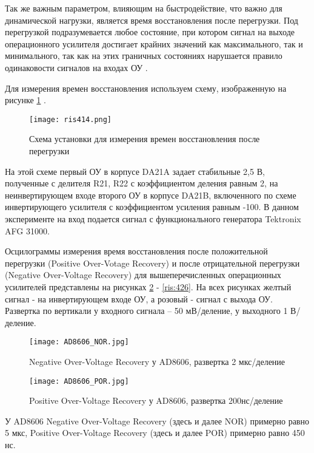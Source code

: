 Так же важным параметром, влияющим на быстродействие, что важно для динамической нагрузки, является 
время восстановления после перегрузки. Под перегрузкой подразумевается  любое состояние, при котором 
сигнал на выходе операционного усилителя достигает крайних значений как максимального, так и минимального,
так как на этих граничных состояниях нарушается правило одинаковости сигналов на входах ОУ \cite{Chopper:OU}.

Для измерения времен восстановления используем схему, изображенную на рисунке \ref{ris:414} \cite{GOST 23089.6-83}.

\begin{figure}[H]
\centering
\texttt{[image: ris414.png]}
\caption{Схема установки для измерения времен восстановления после перегрузки}
\label{ris:414}
\end{figure}

На этой схеме первый ОУ в корпусе DA21A задает стабильные 2,5 В, полученные с делителя R21, R22 с 
коэффициентом деления равным 2, на неинвертирующем входе второго ОУ в корпусе DA21B, включенного по схеме
инвертирующего усилителя с коэффициентом усиления равным -100. В данном эксперименте на вход подается 
сигнал с функционального генератора Tektronix AFG 31000.


Осцилограммы измерения время восстановления после положительной перегрузки (Positive Over-Votage Recovery) 
и после отрицательной перегрузки (Negative Over-Voltage Recovery) для вышеперечисленных операционных усилителей
представлены на рисунках \ref{ris:415} - \ref{ris:426}. На всех рисунках желтый сигнал - на инвертирующем 
входе ОУ, а розовый - сигнал с выхода ОУ. Развертка по вертикали у входного сигнала -- 50 мВ/деление, 
у выходного 1 В/деление. 

\begin{figure}[H]
\centering
\texttt{[image: AD8606\_NOR.jpg]}
\caption{Negative Over-Voltage Recovery у AD8606, развертка 2 мкс/деление}
\label{ris:415}
\end{figure}

\begin{figure}[H]
\centering
\texttt{[image: AD8606\_POR.jpg]}
\caption{Positive Over-Voltage Recovery у AD8606, развертка 200нс/деление}
\label{ris:416}
\end{figure}

У AD8606 Negative Over-Voltage Recovery (здесь и далее NOR) примерно равно 5 мкс,
 Positive Over-Voltage Recovery (здесь и далее POR) примерно равно 450 нс.

